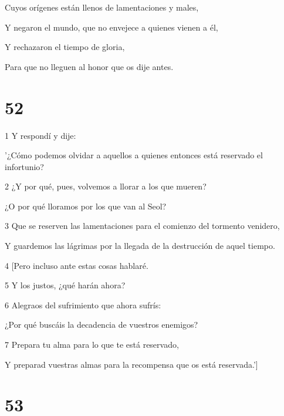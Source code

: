 \par Cuyos orígenes están llenos de lamentaciones y males,

\par Y negaron el mundo, que no envejece a quienes vienen a él,

\par Y rechazaron el tiempo de gloria,

\par Para que no lleguen al honor que os dije antes.

\chapter{52}

\par 1 Y respondí y dije:

\par '¿Cómo podemos olvidar a aquellos a quienes entonces está reservado el infortunio?

\par 2 ¿Y por qué, pues, volvemos a llorar a los que mueren?

\par ¿O por qué lloramos por los que van al Seol?

\par 3 Que se reserven las lamentaciones para el comienzo del tormento venidero,

Y guardemos las lágrimas por la llegada de la destrucción de aquel tiempo.

\par 4 [Pero incluso ante estas cosas hablaré.

\par 5 Y los justos, ¿qué harán ahora?

\par 6 Alegraos del sufrimiento que ahora sufrís:

\par ¿Por qué buscáis la decadencia de vuestros enemigos?

\par 7 Prepara tu alma para lo que te está reservado,

\par Y preparad vuestras almas para la recompensa que os está reservada.']

\chapter{53}

